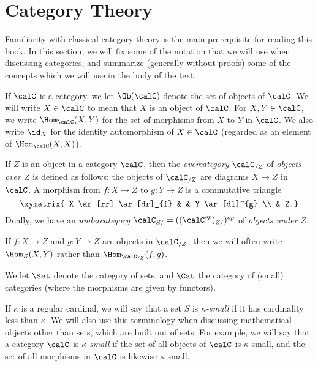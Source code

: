 
\section{Category Theory}\label{catreview}
\begin{CategoryTheory}
\setcounter{theorem}{0}

Familiarity with classical category theory is the main prerequisite for reading this book.
In this section, we will fix some of the notation that we will use when discussing categories, and summarize (generally without proofs) some of the concepts which we will use in the body of the text.

If $\calC$ is a category, we let $\Ob(\calC)$ denote the set of objects of $\calC$. We will write $X \in \calC$ to
mean that $X$ is an object of $\calC$. For $X,Y \in \calC$, we write $\Hom_{\calC}(X,Y)$ for the set of morphisms from $X$ to $Y$ in $\calC$. We also write
$\id_X$ for the identity automorphism of $X \in \calC$ (regarded as an element of $\Hom_{\calC}(X,X)$).

If $Z$ is an object in a category $\calC$, then the {\it overcategory}
$\calC_{/Z}$ of {\it objects over $Z$} is defined as follows: the
objects of $\calC_{/Z}$ are diagrams $X \rightarrow Z$ in $\calC$. A morphism
from $f: X \rightarrow Z$ to $g: Y \rightarrow Z$ is a commutative triangle
$$ \xymatrix{ X \ar[rr] \ar[dr]_{f} & & Y \ar[dl]^{g} \\
& Z.}$$
Dually, we have an {\it undercategory} $\calC_{Z/} = ((\calC^{op})_{Z/})^{op}$ of {\em objects under $Z$}.

If $f: X \rightarrow Z$ and $g: Y \rightarrow Z$ are objects in
$\calC_{/Z}$, then we will often write $\Hom_{Z}(X,Y)$ rather than
$\Hom_{\calC_{/Z}}(f,g)$.

We let $\Set$ denote the category of sets, and $\Cat$ the category of (small) categories (where the morphisms are given by functors).

If $\kappa$ is a regular cardinal, we will say that a set $S$ is {\it $\kappa$-small} if it has cardinality less than $\kappa$. We will also use this terminology when discussing mathematical objects other than sets, which are built out of sets. For example, we will say that a category $\calC$ is {\it $\kappa$-small} if the set of all objects of $\calC$ is $\kappa$-small, and the set of all morphisms in $\calC$ is likewise $\kappa$-small.


\end{CategoryTheory}
